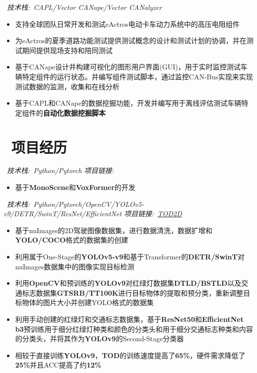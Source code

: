 \documentclass{resume}
\begin{document}
\ \textit{技术栈:\ CAPL/Vector CANape/Vector CANalyzer}
\begin{itemize}
  \item 支持全球团队日常开发和测试eActros电动卡车动力系统中的高压电阻组件
  \item 为eActros的夏季道路功能测试提供测试概念的设计和测试计划的协调，并在测试期间提供现场支持和陪同测试
  \item 基于CANape设计并构建可视化的图形用户界面(GUI)，用于实时监控测试车辆特定组件的运行状态。并编写组件测试脚本，通过监控CAN-Bus实现来实现测试数据的监测，收集和在线分析
  \item 基于CAPL和CANape的数据挖掘功能，开发并编写用于离线评估测试车辆特定组件的\textbf{自动化数据挖掘脚本}
\end{itemize}
\vspace{0.1cm}

\section{\faFolder\ 项目经历}
\ \textit{技术栈:\ Python/Pytorch \hfill 项目链接:\ }
\begin{itemize}
  \item 基于\textbf{MonoScene}和\textbf{VoxFormer}的开发
\end{itemize}
\vspace{0.1cm}

\ \textit{技术栈:\ Python/Pytorch/OpenCV/YOLOv5-v9/DETR/SwinT/ResNet/EfficientNet \hfill 项目链接:\ \href{https://github.com/LuckyMax0722/TOD2D}{TOD2D}}
\begin{itemize}
  \item 基于nuImages的2D驾驶图像数据集，进行数据清洗，数据扩增和\textbf{YOLO/COCO}格式的数据集的创建
  \item 利用属于One-Stage的\textbf{YOLOv5-v9}和基于Transformer的\textbf{DETR/SwinT}对nuImages数据集中的图像实现目标检测
  \item 利用\textbf{OpenCV}和预训练的\textbf{YOLOv9}对红绿灯数据集\textbf{DTLD/BSTLD}以及交通标志数据集\textbf{GTSRB/TT100K}进行目标物体的提取和预分类，重新调整目标物体的图片大小并创建YOLO格式的数据集
  \item 利用手动创建的红绿灯和交通标志数据集，基于\textbf{ResNet50}和\textbf{EfficientNet b3}预训练用于细分红绿灯种类和颜色的分类头和用于细分交通标志种类和内容的分类头，并将其作为\textbf{YOLOv9}的Second-Stage分类器
  \item 相较于直接训练\textbf{YOLOv9}，\textbf{TOD}的训练速度提高了\textbf{65\%}，硬件需求降低了\textbf{25\%}并且ACC提高了约\textbf{12\%}
\end{itemize}
\vspace{0.1cm}
\end{document}
